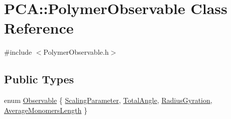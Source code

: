 \hypertarget{class_p_c_a_1_1_polymer_observable}{}\section{P\+CA\+:\+:Polymer\+Observable Class Reference}
\label{class_p_c_a_1_1_polymer_observable}


{\ttfamily \#include $<$Polymer\+Observable.\+h$>$}

\subsection*{Public Types}
\begin{DoxyCompactItemize}
\item 
enum \hyperlink{class_p_c_a_1_1_polymer_observable_a6dcabbc3bc249018c2c94825bff2c94f}{Observable} \{ \hyperlink{class_p_c_a_1_1_polymer_observable_a6dcabbc3bc249018c2c94825bff2c94fa0fbc808b6c1b04cd6cd30808354f2ac4}{Scaling\+Parameter}, 
\hyperlink{class_p_c_a_1_1_polymer_observable_a6dcabbc3bc249018c2c94825bff2c94fa9cc0a0c7f637afc18b27c94757dda4b9}{Total\+Angle}, 
\hyperlink{class_p_c_a_1_1_polymer_observable_a6dcabbc3bc249018c2c94825bff2c94fadeaff576492062c0c633ff9868907b43}{Radius\+Gyration}, 
\hyperlink{class_p_c_a_1_1_polymer_observable_a6dcabbc3bc249018c2c94825bff2c94fa9c3d1e4ed76d2bf6a991772bb58c7c1e}{Average\+Monomers\+Length}
 \}
\end{DoxyCompactItemize}
